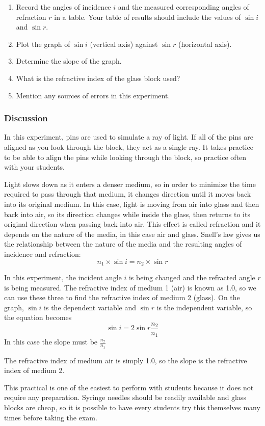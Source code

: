 \begin{enumerate}
\item{Record the angles of incidence $i$ and the measured corresponding angles of
refraction $r$ in a table. Your table of results should include the values of
$\sin{i}$ and $\sin{r}$.}
\item{Plot the graph of $\sin{i}$ (vertical axis) against $\sin{r}$ (horizontal axis).}
\item{Determine the slope of the graph.}
\item{What is the refractive index of the glass block used?}
\item{Mention any sources of errors in this experiment.}
\end{enumerate}

\subsubsection{Discussion}

In this experiment, pins are used to simulate a ray of light. If all of the pins are
aligned as you look through the block, they act as a single ray. It takes practice to be able
to align the pins while looking through the block, so practice often with your students.

Light slows down as it enters a denser medium, so in order to minimize the time
required to pass through that medium, it changes direction until it moves back into its
original medium. In this case, light is moving from air into glass and then back into air,
so its direction changes while inside the glass, then returns to its original direction when
passing back into air. This effect is called refraction and it depends on the nature of the
media, in this case air and glass. Snell’s law gives us the relationship between the nature
of the media and the resulting angles of incidence and refraction:
$$n_1 \times \sin{i} = n_2 \times \sin{r}$$

In this experiment, the incident angle $i$ is being changed and the refracted angle $r$
is being measured. The refractive index of medium 1 (air) is known as 1.0, so we can use
these three to find the refractive index of medium 2 (glass). On the graph, $\sin{i}$ is the
dependent variable and $\sin{r}$ is the independent variable, so the equation becomes
$$\sin{i} = 2 \sin{r} \frac{n_2}{n_1}$$
In this case the slope must be $\frac{n_2}{n_1}$

The refractive index of medium air is simply 1.0, so the slope is the refractive index of
medium 2.

This practical is one of the easiest to perform with students because it does not
require any preparation. Syringe needles should be readily available and glass blocks are
cheap, so it is possible to have every students try this themselves many times before
taking the exam.

